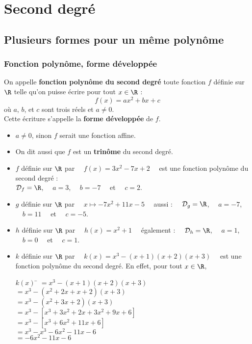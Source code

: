 \documentclass[a4paper,11pt,cours]{nsi}
\begin{document}
\chapter{Second degré}
\section{Plusieurs formes pour un même polynôme}
\subsection{Fonction polynôme, forme développée}
\begin{definition}
	On appelle \textbf{fonction polynôme du second degré} toute fonction $f$ définie sur $\R$ telle qu'on puisse écrire pour tout $x\in\R$ :
	{\boldmath $$f(x)=ax^2+bx+c$$ }
	où $a$, $b$, et $c$ sont trois réels et $a\neq 0$.\\
	Cette écriture s'appelle la \textbf{forme développée} de $f$.
\end{definition}
\begin{itemize}
	\item 	$a\neq 0$, sinon $f$ serait une fonction affine.
	\item 	On dit aussi que $f$ est un \textbf{trinôme} du second degré.
\end{itemize}
\begin{exemple}[s]
	\begin{itemize}
		\item 	$f$ définie sur $\R$ par $\quad f(x)=3x^2-7x+2 \quad $ est une fonction polynôme du second degré :\\
		$\mathcal{D}_f=\R$, $\quad a=3$, $\quad b=-7 \quad$ et $\quad c=2$.
		\item 	$g$ définie sur $\R$ par $\quad x\mapsto -7x^2+11x-5 \quad$ aussi :	$\quad \mathcal{D}_g=\R$, $\quad a=-7$, $\quad b=11 \quad$ et $\quad c=-5$.
		\item 	$h$ définie sur $\R$ par $\quad h(x)=x^2+1 \quad$ également : $\quad \mathcal{D}_h=\R$, $\quad a=1$, $\quad b=0 \quad$ et $\quad c=1$.
		\item 	$k$ définie sur $\R$ par $\quad k(x)=x^3-(x+1)(x+2)(x+3)\quad$ est une fonction polynôme du second degré.
		En effet, pour tout $x\in\R$,
		\begin{tabbing}
			$k(x)$	\=	$=x^3-(x+1)(x+2)(x+3)$\\
			\>	$=x^3-(x^2+2x+x+2)(x+3)$\\
			\>	$=x^3-(x^2+3x+2)(x+3)$\\
			\>	$=x^3-[x^3+3x^2+2x+3x^2+9x+6]$\\
			\>	$=x^3-[x^3+6x^2+11x+6]$\\
			\>	$=x^3-x^3-6x^2-11x-6$\\
			\>	$=-6x^2-11x-6$
		\end{tabbing}
	\end{itemize}
\end{exemple}
\end{document}
